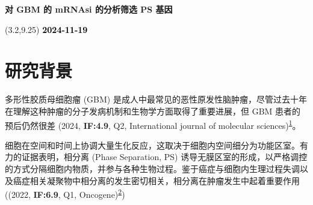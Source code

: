 \documentclass[
]{article}
\author{}
\date{\vspace{-2.5em}}
\begin{document}
\begin{titlepage} 
\begin{center} \textbf{\huge 对 GBM 的 mRNAsi
的分析筛选 PS 基因} \vspace{4em}
\begin{textblock}{10}(3.2,9.25) \huge
\textbf{\textcolor{black}{2024-11-19}}
\end{textblock} \end{center} \end{titlepage}
\restoregeometry


\begin{center}\vspace{1.5cm}\end{center}\tableofcontents

\begin{center}\vspace{1.5cm}\end{center}\listoffigures

\begin{center}\vspace{1.5cm}\end{center}\listoftables

\newpage


\hypertarget{abstract}{%
\section{研究背景}\label{abstract}}

多形性胶质母细胞瘤 (GBM) 是成人中最常见的恶性原发性脑肿瘤，尽管过去十年在理解这种肿瘤的分子发病机制和生物学方面取得了重要进展，但 GBM 患者的预后仍然很差 (2024, \textbf{IF:4.9}, Q2, International journal of molecular sciences)\textsuperscript{\protect\hyperlink{ref-Glioblastoma_A_Lan_Z_2024}{1}}。

细胞在空间和时间上协调大量生化反应，这取决于细胞内空间细分为功能区室。有力的证据表明，相分离 (Phase Separation, PS) 诱导无膜区室的形成，以严格调控的方式分隔细胞内物质，并参与各种生物过程。鉴于癌症与细胞内生理过程失调以及癌症相关凝聚物中相分离的发生密切相关，相分离在肿瘤发生中起着重要作用 ((2022, \textbf{IF:6.9}, Q1, Oncogene)\textsuperscript{\protect\hyperlink{ref-Phase_separatio_Gu_Xi_2022}{2}})
\end{document}
